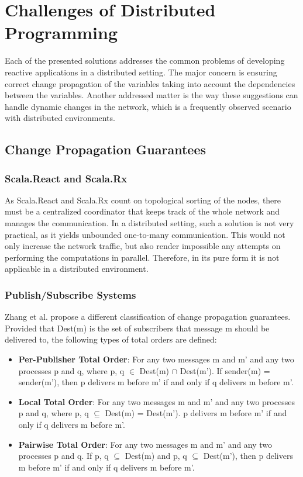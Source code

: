 \documentclass{sigplanconf}
\begin{document}
\section{Challenges of Distributed Programming}
Each of the presented solutions addresses the common problems of developing reactive applications in a distributed setting. The major concern is ensuring correct change propagation of the variables taking into account the dependencies between the variables. Another addressed matter is the way these suggestions can handle dynamic changes in the network, which is a frequently observed scenario with distributed environments.

\subsection{Change Propagation Guarantees}
\subsubsection{Scala.React and Scala.Rx}
As Scala.React and Scala.Rx count on topological sorting of the nodes, there must be a centralized coordinator that keeps track of the whole network and manages the communication. In a distributed setting, such a solution is not very practical, as it yields unbounded one-to-many communication. This would not only increase the network traffic, but also render impossible any attempts on performing the computations in parallel. Therefore, in its pure form it is not applicable in a distributed environment.

\subsubsection{Publish/Subscribe Systems}
Zhang et al. \cite{totalorder} propose a different classification of change propagation guarantees. Provided that Dest(m) is the set of subscribers that message m should be delivered to, the following types of total orders are defined:

\begin{itemize} \itemsep1pt \parskip0pt 
  \item \textbf{Per-Publisher Total Order}: For any two messages m and m' and any two processes p and q, where {p, q} $\in$ Dest(m) $\cap$ Dest(m'). If sender(m) = sender(m'), then p delivers m before m' if and only if q delivers m before m'.

  \item \textbf{Local Total Order}: For any two messages m and m' and any two processes p and q, where {p, q} $\subseteq$ Dest(m) = Dest(m'). p delivers m before m' if and only if q delivers m before m'.

  \item \textbf{Pairwise Total Order}: For any two messages m and m' and any two processes p and q. If {p, q} $\subseteq$ Dest(m) and {p, q} $\subseteq$ Dest(m'), then p delivers m before m' if and only if q delivers m before m'.

\end{itemize}
\end{document}
